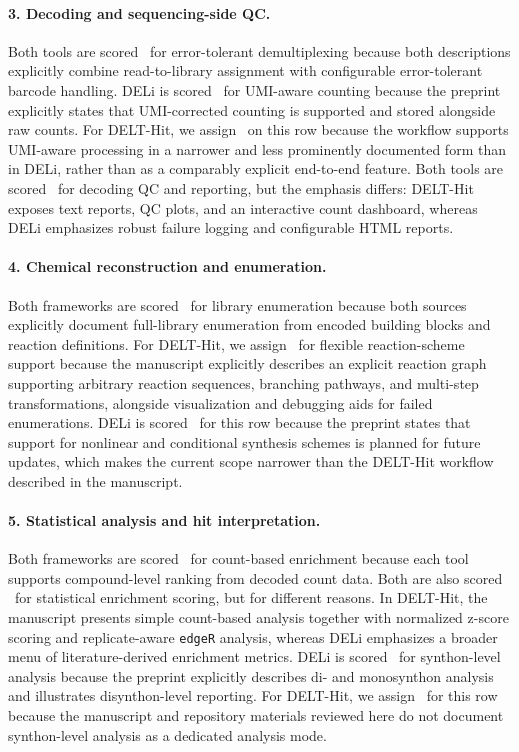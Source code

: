 \documentclass[pdflatex,sn-nature]{sn-jnl}
\begin{document}
\paragraph{3. Decoding and sequencing-side QC.}
Both tools are scored \statusgreen\ for error-tolerant demultiplexing because both descriptions explicitly combine read-to-library assignment with configurable error-tolerant barcode handling. DELi is scored \statusgreen\ for UMI-aware counting because the preprint explicitly states that UMI-corrected counting is supported and stored alongside raw counts. For DELT-Hit, we assign \statusamber\ on this row because the workflow supports UMI-aware processing in a narrower and less prominently documented form than in DELi, rather than as a comparably explicit end-to-end feature. Both tools are scored \statusgreen\ for decoding QC and reporting, but the emphasis differs: DELT-Hit exposes text reports, QC plots, and an interactive count dashboard, whereas DELi emphasizes robust failure logging and configurable HTML reports.

\paragraph{4. Chemical reconstruction and enumeration.}
Both frameworks are scored \statusgreen\ for library enumeration because both sources explicitly document full-library enumeration from encoded building blocks and reaction definitions. For DELT-Hit, we assign \statusgreen\ for flexible reaction-scheme support because the manuscript explicitly describes an explicit reaction graph supporting arbitrary reaction sequences, branching pathways, and multi-step transformations, alongside visualization and debugging aids for failed enumerations. DELi is scored \statusred\ for this row because the preprint states that support for nonlinear and conditional synthesis schemes is planned for future updates, which makes the current scope narrower than the DELT-Hit workflow described in the manuscript.

\paragraph{5. Statistical analysis and hit interpretation.}
Both frameworks are scored \statusgreen\ for count-based enrichment because each tool supports compound-level ranking from decoded count data. Both are also scored \statusgreen\ for statistical enrichment scoring, but for different reasons. In DELT-Hit, the manuscript presents simple count-based analysis together with normalized z-score scoring and replicate-aware \texttt{edgeR} analysis, whereas DELi emphasizes a broader menu of literature-derived enrichment metrics. DELi is scored \statusgreen\ for synthon-level analysis because the preprint explicitly describes di- and monosynthon analysis and illustrates disynthon-level reporting. For DELT-Hit, we assign \statusred\ for this row because the manuscript and repository materials reviewed here do not document synthon-level analysis as a dedicated analysis mode.
\end{document}
